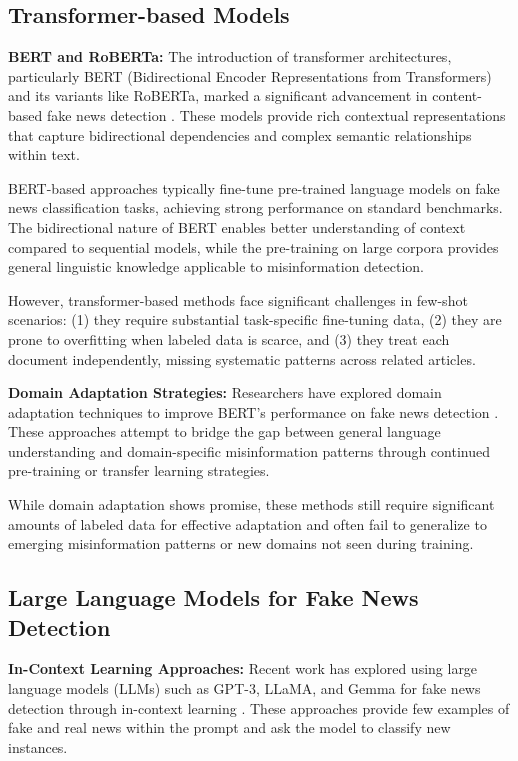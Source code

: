 \subsection{Transformer-based Models}

\textbf{BERT and RoBERTa:} The introduction of transformer architectures, particularly BERT (Bidirectional Encoder Representations from Transformers) and its variants like RoBERTa, marked a significant advancement in content-based fake news detection \cite{kula2021survey, kaliyar2021fakebert}. These models provide rich contextual representations that capture bidirectional dependencies and complex semantic relationships within text.

BERT-based approaches typically fine-tune pre-trained language models on fake news classification tasks, achieving strong performance on standard benchmarks. The bidirectional nature of BERT enables better understanding of context compared to sequential models, while the pre-training on large corpora provides general linguistic knowledge applicable to misinformation detection.

However, transformer-based methods face significant challenges in few-shot scenarios: (1) they require substantial task-specific fine-tuning data, (2) they are prone to overfitting when labeled data is scarce, and (3) they treat each document independently, missing systematic patterns across related articles.

\textbf{Domain Adaptation Strategies:} Researchers have explored domain adaptation techniques to improve BERT's performance on fake news detection \cite{wright2020domain, silva2021cross}. These approaches attempt to bridge the gap between general language understanding and domain-specific misinformation patterns through continued pre-training or transfer learning strategies.

While domain adaptation shows promise, these methods still require significant amounts of labeled data for effective adaptation and often fail to generalize to emerging misinformation patterns or new domains not seen during training.

\subsection{Large Language Models for Fake News Detection}

\textbf{In-Context Learning Approaches:} Recent work has explored using large language models (LLMs) such as GPT-3, LLaMA, and Gemma for fake news detection through in-context learning \cite{chen2023combating, openai2023gpt4}. These approaches provide few examples of fake and real news within the prompt and ask the model to classify new instances.

